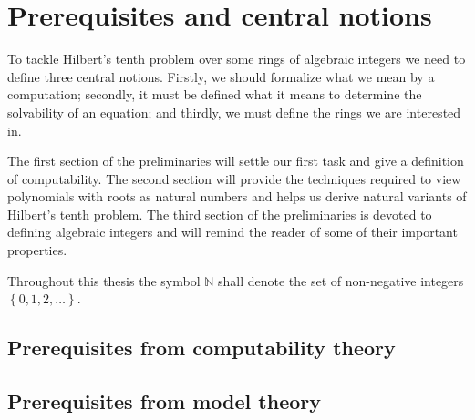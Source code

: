 \documentclass[12pt, a4paper, numbers=noenddot]{scrbook}
\numberwithin{equation}{section}
\newcommand{\set}[1]{\left\lbrace #1 \right\rbrace}
\begin{document}


\allowdisplaybreaks

\frontmatter



\mainmatter

\chapter{Prerequisites and central notions}

To tackle Hilbert's tenth problem over some rings of algebraic integers we need
to define three central notions. Firstly, we should formalize what we mean by a
computation; secondly, it must be defined what it means to determine the
solvability of an equation; and thirdly, we must define the rings we are
interested in.

The first section of the preliminaries will settle our first task and give a
definition of computability. The second section will provide the techniques
required to view polynomials with roots as natural numbers and helps us derive
natural variants of Hilbert's tenth problem. The third section of the
preliminaries is devoted to defining algebraic integers and will remind the
reader of some of their important properties.

Throughout this thesis the symbol \(ℕ\) shall denote the set of non-negative
integers \(\set{0, 1, 2, …}\).

\section{Prerequisites from computability theory}%
\label{sec:computability theory}


\section{Prerequisites from model theory}\label{sec:model theory}

\end{document}
